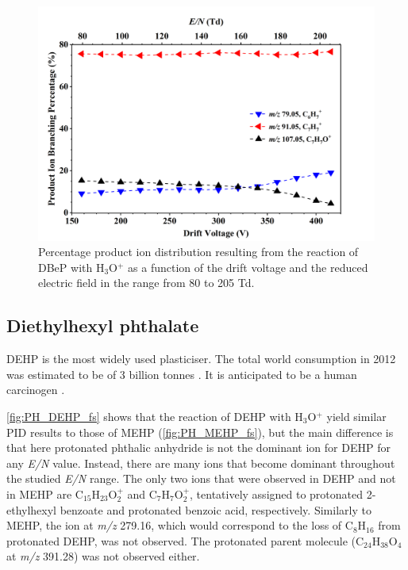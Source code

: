 \begin{figure}[htb]%
\centering
\includegraphics[height=0.4\textheight]{pics/DBeP-BR.png}
\caption{Percentage product ion distribution resulting from the reaction of DBeP with H$_3$O$^+$ as a function of the drift voltage and the reduced electric field in the range from 80 to 205 Td.}
\label{fig:PH_DBeP_fs}
\end{figure}


\subsection{Diethylhexyl phthalate}




DEHP is the most widely used plasticiser. The total world consumption in 2012 was estimated to be of 3 billion tonnes \cite{doi:10.1002/14356007.a20_181.pub2}.
It is anticipated to be a human carcinogen \cite{us201614th}.



\autoref{fig:PH_DEHP_fs} shows that the reaction of DEHP with H$_3$O$^+$ yield similar PID results to those of MEHP (\autoref{fig:PH_MEHP_fs}), but the main difference is that here protonated phthalic anhydride is not the dominant ion for DEHP for any \textit{E/N} value. Instead, there are many ions that become dominant throughout the studied \textit{E/N} range.
The only two ions that were observed in DEHP and not in MEHP are  C$_{15}$H$_{23}$O$_2^+$
and C$_7$H$_{7}$O$_2^+$, tentatively assigned to 
protonated 2-ethylhexyl benzoate  and protonated benzoic acid, respectively.
Similarly to MEHP, the ion at \textit{m/z} 279.16, which would correspond to the loss of C$_8$H$_{16}$ from protonated DEHP, was not observed.
The protonated parent molecule (C$_{24}$H$_{38}$O$_{4}$ at \textit{m/z} 391.28) was not observed either.



